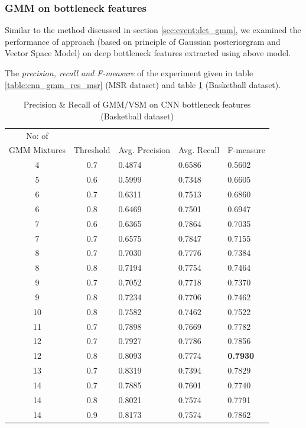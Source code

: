 \subsubsection{GMM on bottleneck features}
Similar to the method discussed in section \ref{sec:event:dct_gmm}, we examined the performance of approach (based on principle of Gaussian posteriorgram and Vector Space Model) on deep bottleneck features extracted using above model. 

The \textit{precision, recall and F-measure} of the experiment given in table \ref{table:cnn_gmm_res_msr} (MSR dataset) and table \ref{table:cnn_gmm_res_basket} (Basketball dataset).

\begin{table}[h]
\centering
\begin{tabular}{|c|c|l|l|l|}
\hline
No: of &&&&\\
GMM Mixtures & Threshold & Avg. Precision & Avg. Recall & F-measure\\
\hline
\hline
4 	&0.7 	&0.4874 	& 0.6586	&0.5602\\
5 	&0.6 	&0.5999 	& 0.7348	&0.6605\\
6 	&0.7 	&0.6311 	& 0.7513	&0.6860\\
6 	&0.8 	&0.6469 	& 0.7501	&0.6947\\
7 	&0.6 	&0.6365 	& 0.7864	&0.7035\\
7 	&0.7 	&0.6575 	& 0.7847	&0.7155\\
8 	&0.7 	&0.7030 	& 0.7776	&0.7384\\
8 	&0.8 	&0.7194 	& 0.7754	&0.7464\\
9 	&0.7 	&0.7052 	& 0.7718	&0.7370\\
9 	&0.8 	&0.7234 	& 0.7706	&0.7462\\
10 	&0.8 	&0.7582 	& 0.7462	&0.7522\\
11 	&0.7 	&0.7898 	& 0.7669	&0.7782\\
12 	&0.7 	&0.7927 	& 0.7786	&0.7856\\
12 	&0.8 	&0.8093 	& 0.7774	&\textbf{0.7930}\\
13 	&0.7 	&0.8319 	& 0.7394	&0.7829\\
14 	&0.7 	&0.7885 	& 0.7601	&0.7740\\
14 	&0.8 	&0.8021 	& 0.7574	&0.7791\\
14 	&0.9 	&0.8173 	& 0.7574	&0.7862\\
\hline  
\end{tabular}
\caption[Event spotting using GMM/VSM on CNN(Gray,Frame diff,Edge) bottleneck features (MSR Action Dataset) ]{ Precision \& Recall  of GMM/VSM on CNN bottleneck features (Basketball dataset)}
\label{table:cnn_gmm_res_basket}
\end{table}
\pagebreak
